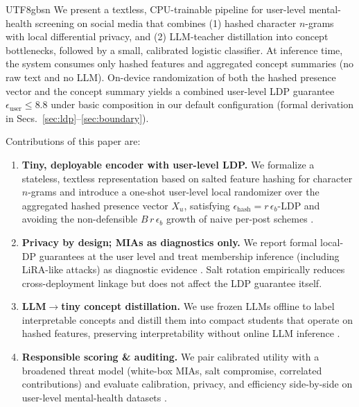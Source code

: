 \documentclass[lettersize,journal]{IEEEtran}
\begin{document}
\begin{CJK*}{UTF8}{gbsn}
We present a textless, CPU-trainable pipeline for user-level mental-health screening on social media that combines (1) hashed character $n$-grams with local differential privacy, and (2) LLM-teacher distillation into concept bottlenecks, followed by a small, calibrated logistic classifier. At inference time, the system consumes only hashed features and aggregated concept summaries (no raw text and no LLM). On-device randomization of both the hashed presence vector and the concept summary yields a combined user-level LDP guarantee $\epsilon_{\text{user}} \le 8.8$ under basic composition in our default configuration (formal derivation in Secs.~\ref{sec:ldp}--\ref{sec:boundary}).

Contributions of this paper are:
\begin{enumerate}[label=(\roman*), leftmargin=2em, itemsep=3pt]
\item \textbf{Tiny, deployable encoder with user-level LDP.} We formalize a stateless, textless representation based on salted feature hashing for character $n$-grams and introduce a one-shot user-level local randomizer over the aggregated hashed presence vector $X_u$, satisfying $\epsilon_{\text{hash}}{=}r\,\epsilon_b$-LDP and avoiding the non-defensible $B\,r\,\epsilon_b$ growth of naive per-post schemes \cite{weinberger2009featurehashing,duchi2013localprivacy,kairouz2015composition}.
\item \textbf{Privacy by design; MIAs as diagnostics only.} We report formal local-DP guarantees at the user level and treat membership inference (including LiRA-like attacks) as diagnostic evidence \cite{shokri2017mia,shejwalkar2021nlpmia}. Salt rotation empirically reduces cross-deployment linkage but does not affect the LDP guarantee itself.
\item \textbf{LLM$\rightarrow$tiny concept distillation.} We use frozen LLMs offline to label interpretable concepts and distill them into compact students that operate on hashed features, preserving interpretability without online LLM inference \cite{koh2020concept,hinton2015distilling,demszky2020goemotions}.
\item \textbf{Responsible scoring \& auditing.} We pair calibrated utility with a broadened threat model (white-box MIAs, salt compromise, correlated contributions) and evaluate calibration, privacy, and efficiency side-by-side on user-level mental-health datasets \cite{erling2014rappor,wang2017ldp,acharya2019hr}.
\end{enumerate}





\end{CJK*}
\end{document}
